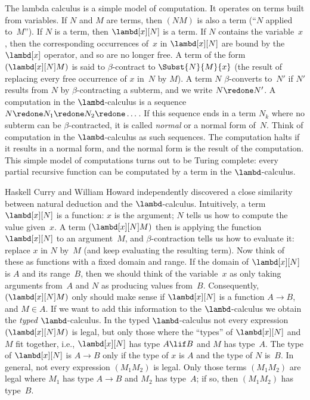 \documentclass[../../../include/open-logic-section]{subfiles}
\begin{document}


The lambda calculus is a simple model of computation. It operates on
terms built from variables. If $N$ and $M$ are terms, then $(NM)$ is
also a term (``$N$ applied to~$M$''). If $N$ is a term, then
$\lambd[x][N]$ is a term. If $N$ contains the variable~$x$, then the
corresponding occurrences of~$x$ in $\lambd[x][N]$ are bound by the
$\lambd[x]$ operator, and so are no longer free. A term of the form
$(\lambd[x][N]M)$ is said to $\beta$-contract to $\Subst{N}{M}{x}$
(the result of replacing every free occurrence of $x$ in~$N$ by $M$).
A term $N$ $\beta$-converts to~$N'$ if $N'$ results from $N$ by
$\beta$-contracting a subterm, and we write $N \redone N'$. A
computation in the $\lambd$-calculus is a sequence $N \redone N_1
\redone N_2 \redone \dots$. If this sequence ends in a term $N_k$
where no subterm can be $\beta$-contracted, it is called \emph{normal}
or a normal form of~$N$. Think of computation in the $\lambd$-calculus
as such sequences. The computation halts if it results in a normal
form, and the normal form is the result of the computation. This
simple model of computations turns out to be Turing complete: every
partial recursive function can be computated by a term in the $\lambd$-calculus.

Haskell Curry and William Howard independently discovered a close
similarity between natural deduction and the $\lambd$-calculus.
Intuitively, a term $\lambd[x][N]$ is a function: $x$ is the argument;
$N$ tells us how to compute the value given~$x$. A term
$(\lambd[x][N]M)$ then is applying the function $\lambd[x][N]$ to an
argument~$M$, and $\beta$-contraction tells us how to evaluate it:
replace $x$ in $N$ by~$M$ (and keep evaluating the resulting term).
Now think of these as functions with a fixed domain and range. If the
domain of $\lambd[x][N]$ is $A$ and its range~$B$, then we should
think of the variable~$x$ as only taking arguments from~$A$ and $N$ as
producing values from~$B$. Consequently, $(\lambd[x][N]M)$ only should
make sense if $\lambd[x][N]$ is a function $A \to B$, and $M \in A$.
If we want to add this information to the $\lambd$-calculus we obtain
the \emph{typed} $\lambd$-calculus. In the typed $\lambd$-calculus not
every expression $(\lambd[x][N]M)$ is legal, but only those where the
``types'' of $\lambd[x][N]$ and $M$ fit together, i.e., $\lambd[x][N]$
has type $A \lif B$ and $M$ has type~$A$. The type of $\lambd[x][N]$
is $A \to B$ only if the type of $x$ is $A$ and the type of $N$
is~$B$. In general, not every expression $(M_1M_2)$ is legal. Only
those terms $(M_1M_2)$ are legal where $M_1$ has type $A \to B$ and
$M_2$ has type~$A$; if so, then $(M_1M_2)$ has type~$B$. 
\end{document}
